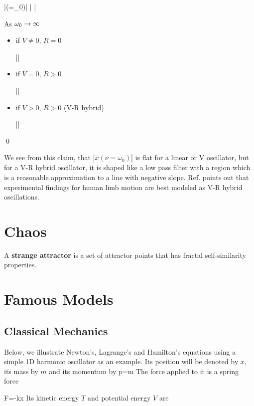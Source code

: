 \beq
|(\nu=\omega_0)|\approx
\left|
\right|
\eeq

As $\omega_0\rightarrow
\infty$
 
\begin{itemize}
\item if $V\neq 0$, $R=0$

\beq
||\propto {}
\eeq

\item if $V= 0$, $R> 0$

\beq
||\propto {}
\eeq

\item if $V> 0$, $R> 0$ (V-R hybrid)

\beq
||\propto {}
\eeq
\end{itemize}
\qed

We see from
this claim,
that $|\tilde{x}(\nu=\omega_0)|$
is flat for a linear or V oscillator,
but for a V-R hybrid oscillator, 
 it is shaped like a low pass filter with a region which is a reasonable approximation to a  line
 with negative slope.
 Ref.\cite{dynamical-fuchs} 
 points out 
 that experimental findings for human limb motion
 are best modeled as V-R hybrid oscillations.
 



\section{Chaos}

A {\bf strange attractor}
is a set of attractor points that has fractal self-similarity 
properties.

\section{Famous Models}

\OtoAd

\subsection{Classical Mechanics}

Below, we illustrate Newton's, Lagrange's and
Hamilton's equations using a simple 1D harmonic
oscillator as an example. 
Its position 
will be denoted by $x$, its mass by $m$ and its momentum by
\beq
p=m
\eeq
The force applied to it is a spring force

\beq
F=-kx
\eeq
Its kinetic energy $T$
and potential energy $V$
are

